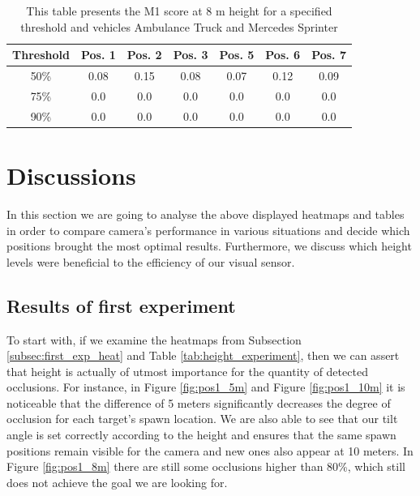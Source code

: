 \begin{table}[!htb]
\caption{This table presents the M1 score at 8 m height for a specified threshold and vehicles Ambulance Truck and Mercedes Sprinter\label{tab:amb_merc_threshold}}
\centering
    \begin{tabular}{ | c | c | c | c | c | c | c |}
    \hline
    Threshold & Pos. 1 & Pos. 2 & Pos. 3 & Pos. 5 & Pos. 6 & Pos. 7 \\ \hline
    50\% & 0.08 & 0.15 & 0.08 & 0.07 & 0.12 & 0.09\\ \hline
    75\% & 0.0 & 0.0 & 0.0 & 0.0 & 0.0 & 0.0\\ \hline
    90\% & 0.0 & 0.0 & 0.0 & 0.0 & 0.0 & 0.0\\ \hline
    \end{tabular}
\end{table}

\newpage
\section{Discussions}\label{discussions}
In this section we are going to analyse the above displayed heatmaps and tables in order to compare camera's performance in various situations and decide which positions brought the most optimal results. Furthermore, we discuss which height levels were beneficial to the efficiency of our visual sensor.

\subsection{Results of first experiment}
To start with, if we examine the heatmaps from Subsection \ref{subsec:first_exp_heat} and Table \ref{tab:height_experiment}, then we can assert that height is actually of utmost importance for the quantity of detected occlusions. For instance, in Figure \ref{fig:pos1_5m} and Figure \ref{fig:pos1_10m} it is noticeable that the difference of 5 meters significantly decreases the degree of occlusion for each target's spawn location. We are also able to see that our tilt angle is set correctly according to the height and ensures that the same spawn positions remain visible for the camera and new ones also appear at 10 meters. In Figure \ref{fig:pos1_8m} there are still some occlusions higher than 80\%, which still does not achieve the goal we are looking for. 

